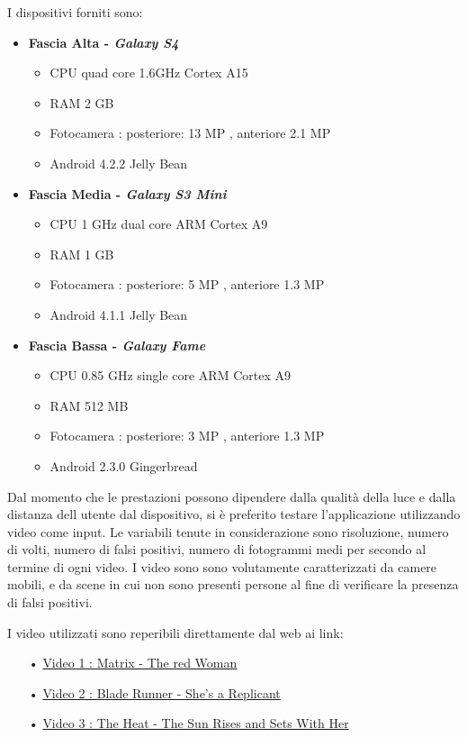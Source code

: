 I dispositivi forniti sono:

\begin{itemize}
\item \textbf{Fascia Alta - \textit{Galaxy S4}} 
	\begin{itemize}
		\item CPU quad core 1.6GHz Cortex A15 
		\item RAM 2 GB 
		\item Fotocamera : posteriore: 13 MP , anteriore 2.1 MP
		\item Android 4.2.2 Jelly Bean 
	\end{itemize}
\item \textbf{Fascia Media - \textit{Galaxy S3 Mini}}
	\begin{itemize}
		\item CPU 1 GHz dual core ARM Cortex A9
		\item RAM 1 GB 
		\item Fotocamera : posteriore: 5 MP , anteriore 1.3 MP
		\item Android 4.1.1 Jelly Bean 
	\end{itemize}
\item \textbf{Fascia Bassa - \textit{Galaxy Fame}}
	\begin{itemize}
		\item CPU 0.85 GHz single core ARM Cortex A9
		\item RAM 512 MB
		\item Fotocamera : posteriore: 3 MP , anteriore 1.3 MP
		\item Android 2.3.0 Gingerbread
	\end{itemize}
\end{itemize}

Dal momento che le prestazioni possono dipendere dalla qualità della luce e dalla distanza dell utente dal dispositivo, si è preferito testare l'applicazione utilizzando video come input. Le variabili tenute in considerazione sono risoluzione, numero di volti, numero di falsi positivi, numero di fotogrammi medi per secondo al termine di ogni video. I video sono sono volutamente caratterizzati da camere mobili, e da scene in cui non sono presenti persone al fine di verificare la presenza di falsi positivi.

I video utilizzati sono reperibili direttamente dal web ai link:

\begin{itemize}
\item[•] \href{http://www.youtube.com/watch?v=XFTbN10f_Fg}{Video 1 : Matrix - The red Woman}
\item[•] \href{http://www.youtube.com/watch?v=yWPyRSURYFQ}{Video 2 : Blade Runner - She's a Replicant}
\item[•] \href{http://www.youtube.com/watch?v=s3rv0BdxWfM}{Video 3 : The Heat - The Sun Rises and Sets With Her }
\end{itemize}


